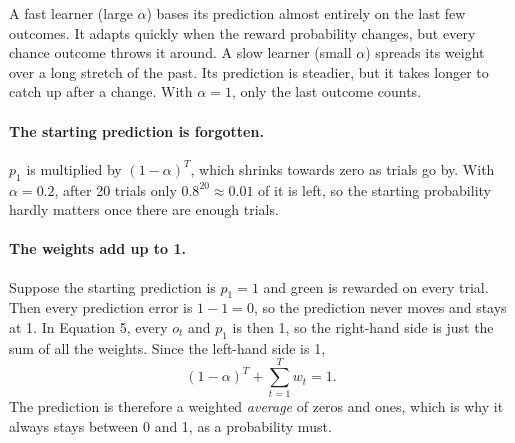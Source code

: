 \documentclass[11pt,a4paper]{article}
\begin{document}
\begin{center}
\end{center}

A fast learner (large $\alpha$) bases its prediction almost entirely on the last few outcomes.
It adapts quickly when the reward probability changes, but every chance outcome throws it around.
A slow learner (small $\alpha$) spreads its weight over a long stretch of the past. Its
prediction is steadier, but it takes longer to catch up after a change. With $\alpha = 1$, only
the last outcome counts.

\paragraph{The starting prediction is forgotten.}
$p_1$ is multiplied by $(1-\alpha)^T$, which shrinks towards zero as trials go by. With
$\alpha = 0.2$, after 20 trials only $0.8^{20} \approx 0.01$ of it is left, so the starting
probability hardly matters once there are enough trials.

\paragraph{The weights add up to 1.}
Suppose the starting prediction is $p_1 = 1$ and green is rewarded on every trial. Then every
prediction error is $1 - 1 = 0$, so the prediction never moves and stays at 1. In Equation 5,
every $o_t$ and $p_1$ is then 1, so the right-hand side is just the sum of all the weights.
Since the left-hand side is 1,
\begin{equation*}
  (1-\alpha)^T + \sum^T_{t=1} w_t = 1 .
\end{equation*}
The prediction is therefore a weighted \emph{average} of zeros and ones, which is why it always
stays between 0 and 1, as a probability must.
\end{document}
